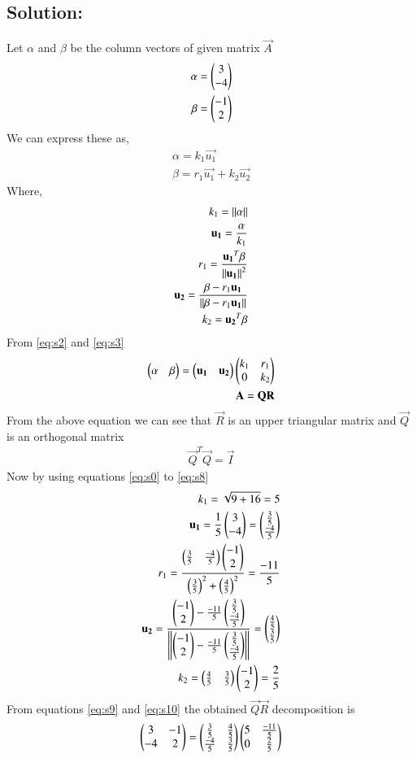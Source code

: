\documentclass[journal,12pt,twocolumn]{IEEEtran}
\begin{document}
\subsection*{Solution:}
Let $\alpha$ and $\beta$ be the column vectors of given matrix $\vec{A}$
\begin{align}
\alpha = \begin{pmatrix}3\\-4\end{pmatrix}\label{eq:s0}\\
\beta = \begin{pmatrix}-1\\2\end{pmatrix}\label{eq:s1}
\end{align}
We can express these as,
\begin{align}
\alpha = k_1\vec{u_1}\label{eq:s2}\\
\beta = r_1\vec{u_1} +k_2\vec{u_2}\label{eq:s3}
\end{align}
Where,
\begin{align}
k_1 = \left\lVert\alpha\right\rVert\label{eq:s4}\\
\mathbf{u_1} =\frac{\alpha}{k_1}\label{eq:s5}\\
r_1 = \frac{\mathbf{u_1}^T\beta}{\left\lVert\mathbf{u_1}\right\rVert^2}\label{eq:s6}\\
\mathbf{u_2} = \frac{\beta-r_1\mathbf{u_1}}{\left\lVert\beta-r_1\mathbf{u_1}\right\rVert}\label{eq:s7}\\
k_2 = \mathbf{u_2}^T\beta\label{eq:s8}
\end{align}
From \eqref{eq:s2} and \eqref{eq:s3}
\begin{align}
\begin{pmatrix}\alpha&\beta\end{pmatrix} = \begin{pmatrix}\mathbf{u_1}&\mathbf{u_2}\end{pmatrix}\begin{pmatrix}k_1&r_1\\0&k_2\end{pmatrix}\label{eq:s9}\\
\mathbf{A}=\mathbf{Q}\mathbf{R}\label{eq:s10}
\end{align}
From the above equation we can see that $\vec{R}$ is an upper triangular matrix and $\vec{Q}$ is an orthogonal matrix
\begin{align}
\vec{Q}^T\vec{Q} = \vec{I}
\end{align}
Now by using equations \eqref{eq:s0} to \eqref{eq:s8}
\begin{align}
k_1 = \sqrt{9+16} = 5\label{eq:s11}\\
\mathbf{u_1} = \frac{1}{5}\begin{pmatrix}3\\-4\end{pmatrix} = \begin{pmatrix}\frac{3}{5}\\\frac{-4}{5}\end{pmatrix}\\
r_1 = \frac{\begin{pmatrix}\frac{3}{5}&\frac{-4}{5}\end{pmatrix}\begin{pmatrix}-1\\2\end{pmatrix}}{\left(\frac{3}{5}\right)^2+\left(\frac{4}{5}\right)^2}=\frac{-11}{5}\\
\mathbf{u_2} = \frac{\begin{pmatrix}-1\\2\end{pmatrix}-\frac{-11}{5}\begin{pmatrix}\frac{3}{5}\\\frac{-4}{5}\end{pmatrix}}{\left\lVert\begin{pmatrix}-1\\2\end{pmatrix}-\frac{-11}{5}\begin{pmatrix}\frac{3}{5}\\\frac{-4}{5}\end{pmatrix}\right\rVert} = \begin{pmatrix}\frac{4}{5}\\\frac{3}{5}\end{pmatrix}\\
k_2 = \begin{pmatrix}\frac{4}{5}&\frac{3}{5}\end{pmatrix}\begin{pmatrix}-1\\2\end{pmatrix} = \frac{2}{5}
\end{align}
From equations \eqref{eq:s9} and \eqref{eq:s10}
the obtained $\vec{Q}\vec{R}$ decomposition is
\begin{align}
\begin{pmatrix}3&-1\\-4&2\end{pmatrix} = \begin{pmatrix}\frac{3}{5}&\frac{4}{5}\\\frac{-4}{5}&\frac{3}{5}\end{pmatrix}\begin{pmatrix}5&\frac{-11}{5}\\0&\frac{2}{5}\end{pmatrix}
\end{align}
\end{document}
